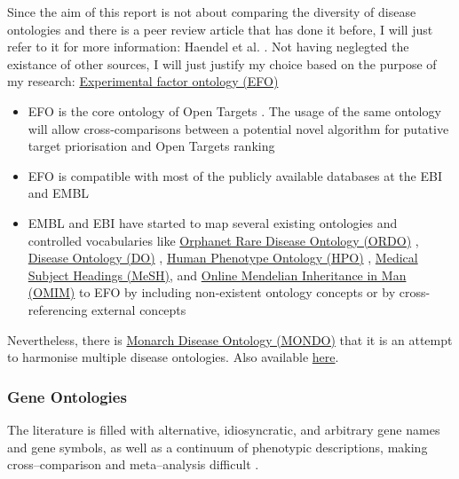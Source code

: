 Since the aim of this report is not about comparing the diversity of disease ontologies and there is a peer review article that has done it before, I will just refer to it for more information: Haendel et al. \cite{haendel2018}. Not having neglegted the existance of other sources, I will just justify my choice based on the purpose of my research: \href{https://www.ebi.ac.uk/efo/}{Experimental factor ontology (EFO)} \cite{experimentalFactorOntology2010}

\begin{itemize}
    \item EFO is the core ontology of Open Targets \cite{koscielny2016}. The usage of the same ontology will allow cross-comparisons between a potential novel algorithm for putative target priorisation and Open Targets ranking \cite{ferrero2017}
    
    \item EFO is compatible with most of the publicly available databases at the EBI and EMBL
    
    \item EMBL and EBI have started to map several existing ontologies and controlled vocabularies like
    \href{https://www.ebi.ac.uk/ols/ontologies/ordo}{Orphanet Rare Disease Ontology (ORDO)} \cite{orphanet2012}, \href{http://disease-ontology.org/}{Disease Ontology (DO)} \cite{do2015},
    \href{https://hpo.jax.org/}{Human Phenotype Ontology (HPO)} \cite{hpo2014},
    \href{https://meshb.nlm.nih.gov}{Medical Subject Headings (MeSH)}, and \href{https://www.omim.org/}{Online Mendelian Inheritance in Man (OMIM)} \cite{omim2015}
    to EFO by including non-existent ontology concepts or by cross-referencing external concepts \cite{koscielny2016}
    
\end{itemize}

Nevertheless, there is \href{https://goo.gl/TxdHxq}{Monarch Disease Ontology (MONDO)} that it is an attempt to harmonise multiple disease ontologies. Also available \href{http://obofoundry.org/ontology/mondo.html}{here}.

\subsubsection{Gene Ontologies}
The literature is filled with alternative, idiosyncratic, and arbitrary gene names and gene symbols, as well as a continuum of phenotypic descriptions, making cross--comparison and meta--analysis difficult \cite{gad2004}.

